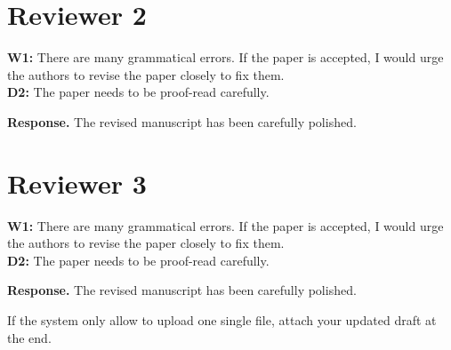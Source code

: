 \documentclass{article}
\begin{document}
\section*{Reviewer 2}
\begin{tcolorbox}[notitle,boxrule=0pt,colback=gray!20,colframe=gray!20]
	\textbf{W1:} There are many grammatical errors. If the paper is accepted, I would urge the authors to revise the paper closely to fix them. \\
	\textbf{D2:} The paper needs to be proof-read carefully.
\end{tcolorbox}
\textbf{Response.} The revised manuscript has been carefully polished. 


\section*{Reviewer 3}
\begin{tcolorbox}[notitle,boxrule=0pt,colback=gray!20,colframe=gray!20]
	\textbf{W1:} There are many grammatical errors. If the paper is accepted, I would urge the authors to revise the paper closely to fix them. \\
	\textbf{D2:} The paper needs to be proof-read carefully.
\end{tcolorbox}
\textbf{Response.} The revised manuscript has been carefully polished. 

\newpage
If the system only allow to upload one single file, attach your updated draft at the end.
%
\end{document}
